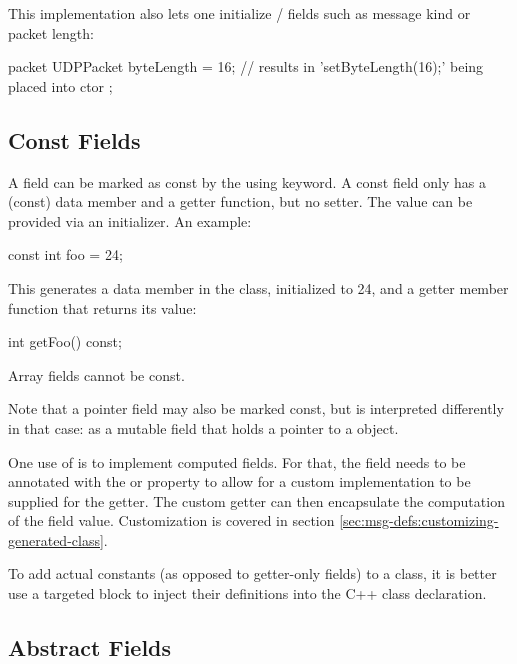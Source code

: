 This implementation also lets one initialize  /
 fields such as message kind or packet length:

\begin{msg}
packet UDPPacket
{
    byteLength = 16;  // results in 'setByteLength(16);' being placed into ctor
};
\end{msg}


\subsection{Const Fields}
\label{sec:msg-defs:const-fields}

A field can be marked as const by the using  keyword. A
const field only has a (const) data member and a getter function, but no
setter. The value can be provided via an initializer. An example:

\begin{msg}
const int foo = 24;
\end{msg}

This generates a  data member in the class, initialized to 24,
and a getter member function that returns its value:

\begin{cpp}
int getFoo() const;
\end{cpp}

Array fields cannot be const.

Note that a pointer field may also be marked const, but  is
interpreted differently in that case: as a mutable field that holds a pointer to
a  object.

One use of  is to implement computed fields. For that, the field
needs to be annotated with the  or  property
to allow for a custom implementation to be supplied for the getter. The custom
getter can then encapsulate the computation of the field value. Customization is
covered in section \ref{sec:msg-defs:customizing-generated-class}.

\begin{note}
To add actual constants (as opposed to getter-only fields) to a class, it
is better use a targeted  block to inject their definitions
into the C++ class declaration.
\end{note}


\subsection{Abstract Fields}
\label{sec:msg-defs:abstract-fields}

